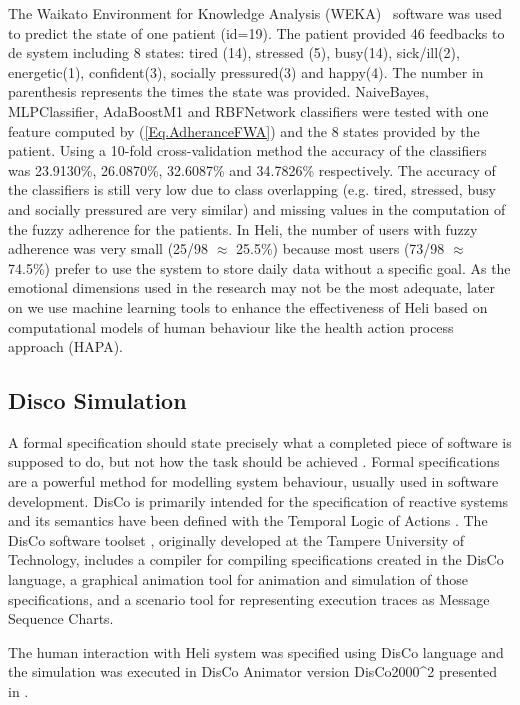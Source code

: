 \documentclass{llncs}
\begin{document}
The Waikato Environment for Knowledge Analysis (WEKA)~\cite{WEKA} software was used to predict the state of one patient (id=19). The patient provided 46 feedbacks to de system including 8 states: tired (14), stressed (5), busy(14), sick/ill(2), energetic(1), confident(3), socially pressured(3) and happy(4). The number in parenthesis represents the times the state was provided. NaiveBayes, MLPClassifier, AdaBoostM1 and RBFNetwork classifiers were tested with one feature computed by (\ref{Eq.AdheranceFWA}) and the 8 states provided by the patient. Using a 10-fold cross-validation method the accuracy of the classifiers was 23.9130\%,  26.0870\%, 32.6087\% and 34.7826\% respectively. The accuracy of the classifiers is still very low due to class overlapping (e.g. tired, stressed, busy and socially pressured are very similar) and missing values in the computation of the fuzzy adherence for the patients. In Heli, the number of users with fuzzy adherence was very small (25/98 $\approx$ 25.5\%) because most users (73/98 $\approx$ 74.5\%) prefer to use the system to store daily data without a specific goal. As the emotional dimensions used in the research may not be the most adequate, later on we use machine learning tools to enhance the effectiveness of Heli based on computational models of human behaviour like the health action process approach (HAPA)\cite{MacPhail}.

\subsection {Disco Simulation}

A formal specification should state precisely what a completed piece of software is supposed to do, but not how the task should be achieved \cite{Diller}. Formal specifications are a powerful method for modelling system behaviour, usually used in software development. DisCo is primarily intended for the specification of reactive systems and its semantics have been defined with the Temporal Logic of Actions \cite{Lamport}.  
The DisCo software toolset \cite{Aaltonen}, originally developed at the Tampere University of Technology, includes a compiler for compiling specifications created in the DisCo language, a graphical animation tool for animation and simulation of those specifications, and a scenario tool for representing execution traces as Message Sequence Charts.

The human interaction with Heli system was specified using DisCo language and the simulation was executed in DisCo Animator version DisCo2000\^{}2  presented in \cite{Nummenmaa}.  
\end{document}
